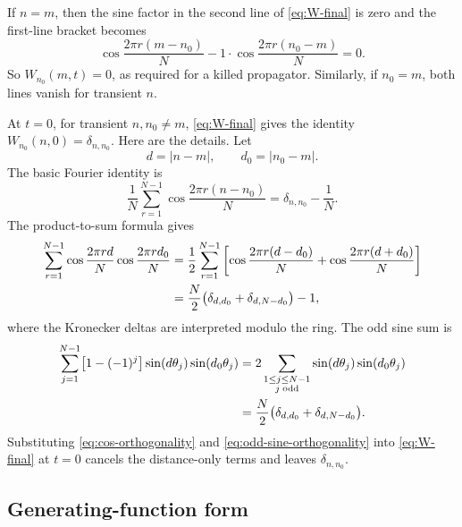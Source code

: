 \documentclass[11pt]{article}
\newcommand{\abs}[1]{\left|#1\right|}
\begin{document}
If $n=m$, then the sine factor in the second line of \eqref{eq:W-final} is zero and the first-line
bracket becomes
\begin{equation}
  \cos\frac{2\pi r(m-n_0)}{N}
  -1\cdot\cos\frac{2\pi r(n_0-m)}{N}=0.
\end{equation}
So $W_{n_0}(m,t)=0$, as required for a killed propagator.  Similarly, if $n_0=m$, both lines
vanish for transient $n$.

At $t=0$, for transient $n,n_0\neq m$, \eqref{eq:W-final} gives the identity
$W_{n_0}(n,0)=\delta_{n,n_0}$.  Here are the details.  Let
\begin{equation}
  d=\abs{n-m},\qquad d_0=\abs{n_0-m}.
\end{equation}
The basic Fourier identity is
\begin{equation}
  \frac1N\sum_{r=1}^{N-1}\cos\frac{2\pi r(n-n_0)}{N}
  =\delta_{n,n_0}-\frac1N.
\end{equation}
The product-to-sum formula gives
\begin{align}
  \sum_{r=1}^{N-1}\cos\frac{2\pi r d}{N}\cos\frac{2\pi r d_0}{N}
  &=\frac12\sum_{r=1}^{N-1}
  \left[\cos\frac{2\pi r(d-d_0)}{N}+\cos\frac{2\pi r(d+d_0)}{N}\right]\notag\\
  &=\frac{N}{2}\bigl(\delta_{d,d_0}+\delta_{d,N-d_0}\bigr)-1,
  \label{eq:cos-orthogonality}
\end{align}
where the Kronecker deltas are interpreted modulo the ring.  The odd sine sum is
\begin{align}
  \sum_{j=1}^{N-1}\bigl[1-(-1)^j\bigr]\sin(d\theta_j)\sin(d_0\theta_j)
  &=2\sum_{\substack{1\leq j\leq N-1\\j\;\mathrm{odd}}}\sin(d\theta_j)\sin(d_0\theta_j)\notag\\
  &=\frac{N}{2}\bigl(\delta_{d,d_0}+\delta_{d,N-d_0}\bigr).
  \label{eq:odd-sine-orthogonality}
\end{align}
Substituting \eqref{eq:cos-orthogonality} and \eqref{eq:odd-sine-orthogonality} into
\eqref{eq:W-final} at $t=0$ cancels the distance-only terms and leaves
$\delta_{n,n_0}$.

\subsection{Generating-function form}
\end{document}
